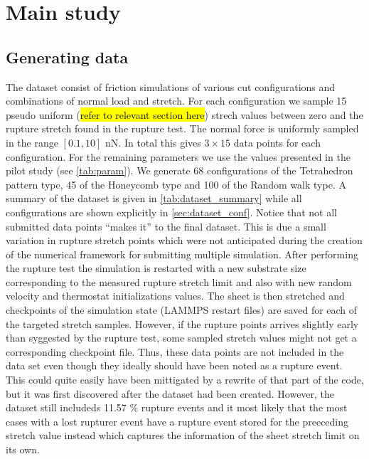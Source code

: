 \chapter{Main study}

\section{Generating data}
The dataset consist of friction simulations of various cut configurations and combinations of normal load and stretch. For each configuration we
sample 15 pseudo uniform (\hl{refer to relevant section here}) strech values
between zero and the rupture stretch found in the rupture test. The normal force
is uniformly sampled in the range $[0.1, 10]$ nN. In total this gives $3\times
15$ data points for each configuration. For the remaining parameters we use the
values presented in the pilot study (see \cref{tab:param}). We generate 68
configurations of the Tetrahedron pattern type, 45 of the Honeycomb type and 100
of the Random walk type. A summary of the dataset is given in \cref{tab:dataset_summary} while all configurations are shown explicitly in \cref{sec:dataset_conf}. Notice that not all submitted data points ``makes it'' to the final dataset. This is due a small variation in rupture stretch points which were not anticipated during the creation of the numerical framework for submitting multiple simulation. After performing the rupture test the simulation is restarted
with a new substrate size corresponding to the measured rupture stretch limit
and also with new random velocity and thermostat initializations values. The sheet is then stretched and checkpoints of the simulation state (LAMMPS restart files) are saved for each of the targeted stretch samples. However, if the rupture points arrives slightly early than syggested by the rupture test, some sampled stretch values might not get a corresponding checkpoint file. Thus, these data points are not included in the data set even though they ideally should have been noted as a rupture event. This could quite easily have been mittigated by a rewrite of that part of the code, but it was first discovered after the dataset had been created. However, the dataset still includeds 11.57 \% rupture events and it most likely that the most cases with a lost rupturer event have a rupture event stored for the preeceding stretch value instead which captures the information of the sheet stretch limit on its own. 

